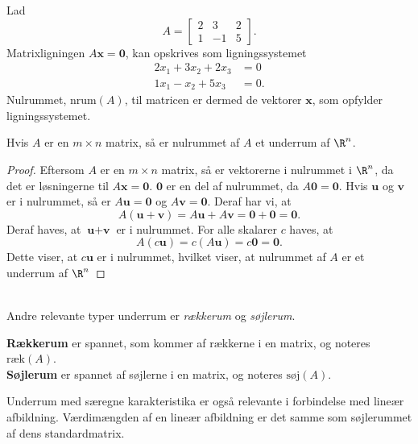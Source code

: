 \begin{eks}
\label{nulrum}
Lad 
$$A=\begin{bmatrix}
2 & 3 & 2\\
1 & -1 & 5
\end{bmatrix}.$$
Matrixligningen $A\textbf{x}=\textbf{0}$,
kan opskrives som ligningssystemet
\begin{align*}
2x_1+3x_2+2x_3&=0\\
1x_1-x_2+5x_3&=0.
\end{align*}
Nulrummet, $\text{nrum}(A)$, til matricen er dermed de vektorer $\textbf{x}$, som opfylder ligningssystemet.
\end{eks} 
%
\begin{thm}{}{}
Hvis $A$ er en $m\times n$ matrix, så er nulrummet af $A$ et underrum af $\R^n$.
\end{thm}
%
\begin{proof}
Eftersom $A$ er en $m\times n$ matrix, så er vektorerne i nulrummet i $\R^n$, da det er løsningerne til $A\textbf{x}=\textbf{0}$. $\textbf{0}$ er en del af nulrummet, da $A\textbf{0}=\textbf{0}$. 
Hvis $\textbf{u}$ og $\textbf{v}$ er i nulrummet, så er $A\textbf{u}=\textbf{0}$ og $A\textbf{v}=\textbf{0}$. 
Deraf har vi, at
%
$$A(\textbf{u}+\textbf{v})=A\textbf{u}+A\textbf{v}=\textbf{0}+\textbf{0}=\textbf{0}.$$
%
Deraf haves, at $\textbf{u}+\textbf{v}$ er i nulrummet. 
For alle skalarer $c$ haves, at
$$A(c\textbf{u})=c(A\textbf{u})=c\textbf{0}=\textbf{0}.$$
Dette viser, at $c\textbf{u}$ er i nulrummet, hvilket viser, at nulrummet af $A$ er et underrum af $\R^n$
\end{proof}
\\
\noindent
Andre relevante typer underrum er \textit{rækkerum} og \textit{søjlerum}.
%
\begin{defn}{}{}
\textbf{Rækkerum} er spannet, som kommer af rækkerne i en matrix, og noteres $\text{ræk}(A)$.
\\
\textbf{Søjlerum} er spannet af søjlerne i en matrix, og noteres $\text{søj}(A)$.
\end{defn}
\noindent
Underrum med særegne karakteristika er også relevante i forbindelse med lineær afbildning.
Værdimængden af en lineær afbildning er det samme som søjlerummet af dens standardmatrix.
%
